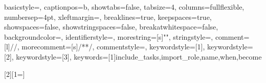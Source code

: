 \usepackage{amsmath}
\usepackage{mathtools}
\usepackage{amssymb}
\usepackage{amsfonts}
\usepackage{latexsym}

\usepackage{algorithm}
\usepackage[noend]{algpseudocode}

\usepackage[procnames]{listings} %
{
    basicstyle=\ttfamily\footnotesize,
    captionpos=b,
    showtabs=false,
    tabsize=4,
    columns=fullflexible,
    numbersep=4pt,
    xleftmargin=\parindent,
    breaklines=true,
    keepspaces=true,
    showspaces=false,
    showstringspaces=false,
    breakatwhitespace=false,
    backgroundcolor=\color{white},
    identifierstyle=\color{black},
    morestring=[s]{"}{"},
    stringstyle=\color{OliveGreen},
    comment=[l]{//},
    morecomment=[s]{/*}{*/},
    commentstyle=\color{OliveGreen},
    keywordstyle={[1]\bfseries\color{Maroon}},
    keywordstyle={[2]\color{RoyalBlue}},
    keywordstyle={[3]\color{BlueGreen}},
    keywords=[1]{include_tasks,import_role,name,when,become}
}

\usepackage{xargs}  %
\usepackage[colorinlistoftodos,prependcaption,textsize=small,textwidth=2cm]{todonotes}
\setlength{\marginparwidth}{2cm}
[2][1=]{}

\usepackage{comment}
\newcommand{\com}[1]{
        \mbox{}
       \marginpar{\hrule\footnotesize\raggedright\hspace{0pt}#1\vspace{2mm}}
}
\newcommand{\rui}[1]{\textcolor{OliveGreen}{#1}}

\hypersetup{colorlinks,linkcolor=,urlcolor=links}

